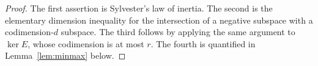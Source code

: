 \begin{proof}
The first assertion is Sylvester's law of inertia. The second is the elementary
dimension inequality for the intersection of a negative subspace with a
codimension-$d$ subspace. The third follows by applying the same argument to
$\ker E$, whose codimension is at most $r$. The fourth is quantified in
Lemma~\ref{lem:minmax} below.
\end{proof}

